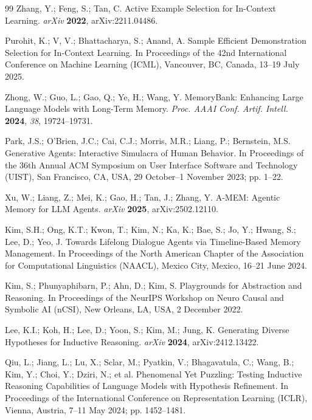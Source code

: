 \documentclass[10pt,a4paper,onecolumn]{article}
\theoremstyle{definition}
\theoremstyle{remark}
\begin{document}
\begin{thebibliography}{99}
Zhang, Y.; Feng, S.; Tan, C. Active Example Selection for In-Context Learning. \emph{arXiv} \textbf{2022}, arXiv:2211.04486.

Purohit, K.; V, V.; Bhattacharya, S.; Anand, A. Sample Efficient Demonstration Selection for In-Context Learning. In Proceedings of the 42nd International Conference on Machine Learning (ICML), Vancouver, BC, Canada, 13--19 July 2025.

Zhong, W.; Guo, L.; Gao, Q.; Ye, H.; Wang, Y. MemoryBank: Enhancing Large Language Models with Long-Term Memory. \emph{Proc. AAAI Conf. Artif. Intell.} \textbf{2024}, \emph{38}, 19724--19731.

Park, J.S.; O'Brien, J.C.; Cai, C.J.; Morris, M.R.; Liang, P.; Bernstein, M.S. Generative Agents: Interactive Simulacra of Human Behavior. In Proceedings of the 36th Annual ACM Symposium on User Interface Software and Technology (UIST), San Francisco, CA, USA, 29 October--1 November 2023; pp. 1--22.

Xu, W.; Liang, Z.; Mei, K.; Gao, H.; Tan, J.; Zhang, Y. A-MEM: Agentic Memory for LLM Agents. \emph{arXiv} \textbf{2025}, arXiv:2502.12110.

Kim, S.H.; Ong, K.T.; Kwon, T.; Kim, N.; Ka, K.; Bae, S.; Jo, Y.; Hwang, S.; Lee, D.; Yeo, J. Towards Lifelong Dialogue Agents via Timeline-Based Memory Management. In Proceedings of the North American Chapter of the Association for Computational Linguistics (NAACL), Mexico City, Mexico, 16--21 June 2024.

Kim, S.; Phunyaphibarn, P.; Ahn, D.; Kim, S. Playgrounds for Abstraction and Reasoning. In Proceedings of the NeurIPS Workshop on Neuro Causal and Symbolic AI (nCSI), New Orleans, LA, USA, 2 December 2022.

Lee, K.I.; Koh, H.; Lee, D.; Yoon, S.; Kim, M.; Jung, K. Generating Diverse Hypotheses for Inductive Reasoning. \emph{arXiv} \textbf{2024}, arXiv:2412.13422.

Qiu, L.; Jiang, L.; Lu, X.; Sclar, M.; Pyatkin, V.; Bhagavatula, C.; Wang, B.; Kim, Y.; Choi, Y.; Dziri, N.; et al. Phenomenal Yet Puzzling: Testing Inductive Reasoning Capabilities of Language Models with Hypothesis Refinement. In Proceedings of the International Conference on Representation Learning (ICLR), Vienna, Austria, 7--11 May 2024; pp. 1452--1481.


\end{thebibliography}
\end{document}
